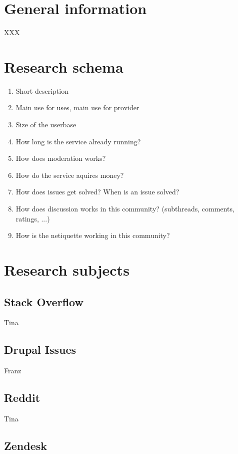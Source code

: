 
\section{General information}
XXX

\section{Research schema}

\begin{enumerate}
  \item  Short description
  \item  Main use for uses, main use for provider
  \item  Size of the userbase
  \item  How long is the service already running?
  \item  How does moderation works?
  \item  How do the service aquires money?
  \item  How does issues get solved? When is an issue solved?
  \item  How does discussion works in this community? (subthreads, comments, ratings, ...)
  \item  How is the netiquette working in this community?
\end{enumerate}  


\section{Research subjects}

\subsection{Stack Overflow}

Tina

\subsection{Drupal Issues}

Franz

\subsection{Reddit}

Tina

\subsection{Zendesk}

